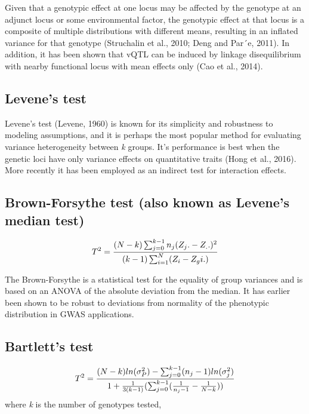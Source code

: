 \documentclass[
]{book}
\begin{document}
Given that a genotypic effect at one locus may be affected by the genotype at an adjunct locus or some environmental factor, the genotypic effect at that locus is a composite of multiple distributions with different means, resulting in an inflated variance for that genotype (Struchalin et al., 2010; Deng and Par´e, 2011). In addition, it has been shown that vQTL can be induced by linkage disequilibrium with nearby functional locus with mean effects only (Cao et al., 2014).

\hypertarget{levenes-test}{%
\subsection{Levene's test}\label{levenes-test}}

Levene's test (Levene, 1960) is known for its simplicity and robustness to modeling assumptions, and it is perhaps the most popular method for evaluating variance heterogeneity between \emph{k} groups. It's performance is best when the genetic loci have only variance effects on quantitative traits (Hong et al., 2016). More recently it has been employed as an indirect test for interaction effects.

\hypertarget{brown-forsythe-test-also-known-as-levenes-median-test}{%
\subsection{Brown-Forsythe test (also known as Levene's median test)}\label{brown-forsythe-test-also-known-as-levenes-median-test}}

\[\LARGE T^2 = \frac{(N-k) \sum_{j=0}^{k-1} n_j(Z_j.-Z_..)^2}{(k-1)\sum_{i=1}^{N}(Z_i-Z_gi.)}\]

The Brown-Forsythe is a statistical test for the equality of group variances and is based on
an ANOVA of the absolute deviation from the median. It has earlier been shown to be robust to deviations from normality of the phenotypic distribution in GWAS applications.

\hypertarget{bartletts-test}{%
\subsection{Bartlett's test}\label{bartletts-test}}

\[\LARGE T^2 = \frac{(N-k)ln(\sigma_P^2)- \sum_{j=0}^{k-1} (n_j-1)ln(\sigma_j^2)}{1+\frac{1}{3(k-1)}(\sum_{j=0}^{k-1}(\frac{1}{n_j-1}-\frac{1}{N-k}))}\]
where \emph{k} is the number of genotypes tested,
\end{document}
